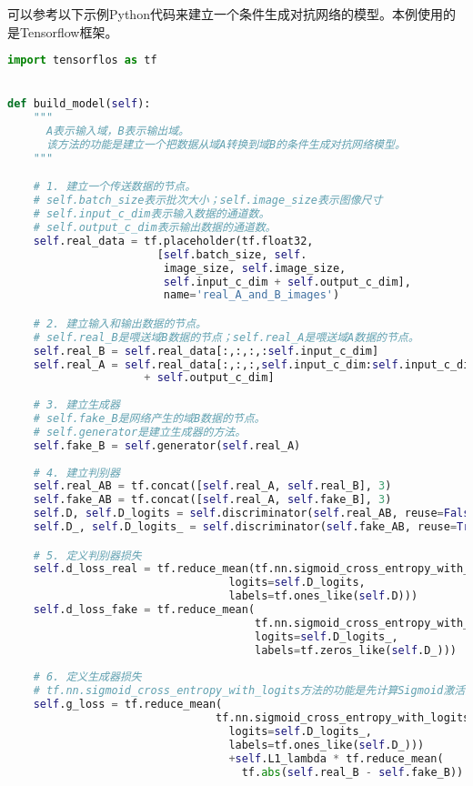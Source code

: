 可以参考以下示例Python代码来建立一个条件生成对抗网络的模型。本例使用的是Tensorflow框架。
\begin{lstlisting}[language=python]
import tensorflos as tf


def build_model(self):
    """
      A表示输入域，B表示输出域。
      该方法的功能是建立一个把数据从域A转换到域B的条件生成对抗网络模型。
    """

    # 1. 建立一个传送数据的节点。
    # self.batch_size表示批次大小；self.image_size表示图像尺寸
    # self.input_c_dim表示输入数据的通道数。
    # self.output_c_dim表示输出数据的通道数。
    self.real_data = tf.placeholder(tf.float32,
                       [self.batch_size, self.    
                        image_size, self.image_size,
                        self.input_c_dim + self.output_c_dim],
                        name='real_A_and_B_images')

    # 2. 建立输入和输出数据的节点。
    # self.real_B是喂送域B数据的节点；self.real_A是喂送域A数据的节点。
    self.real_B = self.real_data[:,:,:,:self.input_c_dim]
    self.real_A = self.real_data[:,:,:,self.input_c_dim:self.input_c_dim 
                     + self.output_c_dim]
    
    # 3. 建立生成器
    # self.fake_B是网络产生的域B数据的节点。
    # self.generator是建立生成器的方法。
    self.fake_B = self.generator(self.real_A)
    
    # 4. 建立判别器
    self.real_AB = tf.concat([self.real_A, self.real_B], 3)
    self.fake_AB = tf.concat([self.real_A, self.fake_B], 3)
    self.D, self.D_logits = self.discriminator(self.real_AB, reuse=False)
    self.D_, self.D_logits_ = self.discriminator(self.fake_AB, reuse=True)

    # 5. 定义判别器损失
    self.d_loss_real = tf.reduce_mean(tf.nn.sigmoid_cross_entropy_with_logits(
                                  logits=self.D_logits, 
                                  labels=tf.ones_like(self.D)))
    self.d_loss_fake = tf.reduce_mean(
                                      tf.nn.sigmoid_cross_entropy_with_logits(
                                      logits=self.D_logits_,
                                      labels=tf.zeros_like(self.D_)))
    
    # 6. 定义生成器损失
    # tf.nn.sigmoid_cross_entropy_with_logits方法的功能是先计算Sigmoid激活函数值，再计算交叉熵。
    self.g_loss = tf.reduce_mean(
                                tf.nn.sigmoid_cross_entropy_with_logits(
                                  logits=self.D_logits_,
                                  labels=tf.ones_like(self.D_)))
                                  +self.L1_lambda * tf.reduce_mean(
                                    tf.abs(self.real_B - self.fake_B))

\end{lstlisting}




